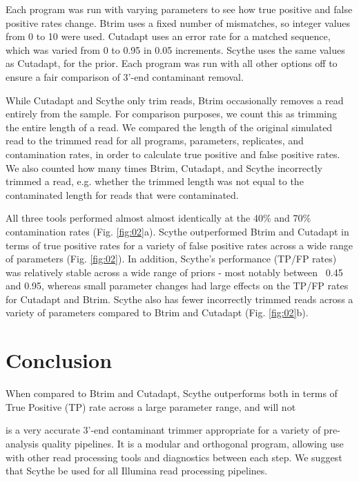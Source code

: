 \documentclass{bioinfo}
\begin{document}
\begin{methods}
Each program was run with varying parameters to see how true positive
and false positive rates change. Btrim uses a fixed number of
mismatches, so integer values from 0 to 10 were used. Cutadapt uses an
error rate for a matched sequence, which was varied from 0 to 0.95 in
0.05 increments. Scythe uses the same values as Cutadapt, for the
prior. Each program was run with all other options off to ensure a
fair comparison of 3'-end contaminant removal.

While Cutadapt and Scythe only trim reads, Btrim occasionally removes
a read entirely from the sample. For comparison purposes, we count
this as trimming the entire length of a read. We compared the length
of the original simulated read to the trimmed read for all programs,
parameters, replicates, and contamination rates, in order to calculate
true positive and false positive rates. We also counted how many times
Btrim, Cutadapt, and Scythe incorrectly trimmed a read, e.g. whether
the trimmed length was not equal to the contaminated length for reads
that were contaminated.

All three tools performed almost almost identically at the 40\% and
70\% contamination rates (Fig. \ref{fig:02}a). Scythe outperformed
Btrim and Cutadapt in terms of true positive rates for a variety of
false positive rates across a wide range of parameters
(Fig. \ref{fig:02}). In addition, Scythe's performance (TP/FP rates)
was relatively stable across a wide range of priors - most notably
between ~0.45 and 0.95, whereas small parameter changes had large
effects on the TP/FP rates for Cutadapt and Btrim. Scythe also has
fewer incorrectly trimmed reads across a variety of parameters
compared to Btrim and Cutadapt (Fig. \ref{fig:02}b).

\end{methods}


\section{Conclusion}

When compared to Btrim and Cutadapt, Scythe outperforms both in terms
of True Positive (TP) rate across a large parameter range, and will not 


is a very accurate 3'-end
contaminant trimmer appropriate for a variety of pre-analysis quality
pipelines. It is a modular and orthogonal program, allowing use with
other read processing tools and diagnostics between each step. We
suggest that Scythe be used for all Illumina read processing
pipelines.
\end{document}

